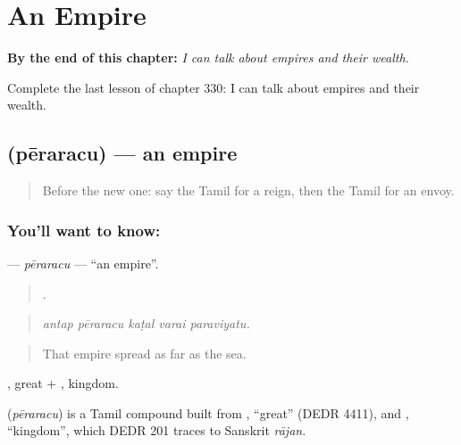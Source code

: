 
\chapter{An Empire}
\label{ch:ta-an-empire}

\begin{chapteropening}
\textbf{By the end of this chapter:} \emph{I can talk about empires and their wealth.}

Complete the last lesson of chapter 330: I can talk about empires and their wealth.
\end{chapteropening}

\section[\texorpdfstring{\ta{பேரரசு} (pēraracu)}{பேரரசு (pēraracu)}]{ (pēraracu) — an empire}

\label{lesson:TA-C330-peraracu}



\begin{quote}
Before the new one: say the Tamil for a reign, then the Tamil for an envoy.
\end{quote}

\subsection*{You'll want to know: }
\textbf{} — \emph{pēraracu} — \textquotedblleft{}an empire\textquotedblright{}.

\begin{quote}
    .
\end{quote}

\begin{quote}
\emph{antap pēraracu kaṭal varai paraviyatu.}
\end{quote}

\begin{quote}
That empire spread as far as the sea.
\end{quote}

, great + , kingdom.

\begin{cousinweb}
\textbf{} (\emph{pēraracu}) is a Tamil compound built from , \textquotedblleft{}great\textquotedblright{} (DEDR 4411), and , \textquotedblleft{}kingdom\textquotedblright{}, which DEDR 201 traces to Sanskrit \emph{rājan}.
\end{cousinweb}

